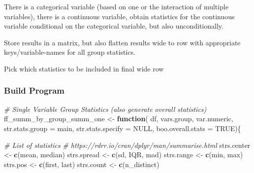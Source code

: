 \documentclass[
]{book}
\newenvironment{Shaded}{\begin{snugshade}}{\end{snugshade}}
\newcommand{\CommentTok}[1]{\textcolor[rgb]{0.56,0.35,0.01}{\textit{#1}}}
\newcommand{\ControlFlowTok}[1]{\textcolor[rgb]{0.13,0.29,0.53}{\textbf{#1}}}
\newcommand{\DataTypeTok}[1]{\textcolor[rgb]{0.13,0.29,0.53}{#1}}
\newcommand{\KeywordTok}[1]{\textcolor[rgb]{0.13,0.29,0.53}{\textbf{#1}}}
\newcommand{\NormalTok}[1]{#1}
\newcommand{\OtherTok}[1]{\textcolor[rgb]{0.56,0.35,0.01}{#1}}
\newcommand{\StringTok}[1]{\textcolor[rgb]{0.31,0.60,0.02}{#1}}
\begin{document}
There is a categorical variable (based on one or the interaction of multiple variables), there is a continuous variable, obtain statistics for the continuous variable conditional on the categorical variable, but also unconditionally.

Store results in a matrix, but also flatten results wide to row with appropriate keys/variable-names for all group statistics.

Pick which statistics to be included in final wide row

\hypertarget{build-program}{%
\subsubsection{Build Program}\label{build-program}}

\begin{Shaded}
\begin{Highlighting}[]
\CommentTok{\# Single Variable Group Statistics (also generate overall statistics)}
\NormalTok{ff\_summ\_by\_group\_summ\_one \textless{}{-}}\StringTok{ }\ControlFlowTok{function}\NormalTok{(}
\NormalTok{  df, vars.group, var.numeric, }\DataTypeTok{str.stats.group =} \StringTok{\textquotesingle{}main\textquotesingle{}}\NormalTok{,}
  \DataTypeTok{str.stats.specify =} \OtherTok{NULL}\NormalTok{, }\DataTypeTok{boo.overall.stats =} \OtherTok{TRUE}\NormalTok{)\{}
  
  \CommentTok{\# List of statistics}
  \CommentTok{\# https://rdrr.io/cran/dplyr/man/summarise.html}
\NormalTok{  strs.center \textless{}{-}}\StringTok{ }\KeywordTok{c}\NormalTok{(}\StringTok{\textquotesingle{}mean\textquotesingle{}}\NormalTok{, }\StringTok{\textquotesingle{}median\textquotesingle{}}\NormalTok{)}
\NormalTok{  strs.spread \textless{}{-}}\StringTok{ }\KeywordTok{c}\NormalTok{(}\StringTok{\textquotesingle{}sd\textquotesingle{}}\NormalTok{, }\StringTok{\textquotesingle{}IQR\textquotesingle{}}\NormalTok{, }\StringTok{\textquotesingle{}mad\textquotesingle{}}\NormalTok{)}
\NormalTok{  strs.range \textless{}{-}}\StringTok{ }\KeywordTok{c}\NormalTok{(}\StringTok{\textquotesingle{}min\textquotesingle{}}\NormalTok{, }\StringTok{\textquotesingle{}max\textquotesingle{}}\NormalTok{)}
\NormalTok{  strs.pos \textless{}{-}}\StringTok{ }\KeywordTok{c}\NormalTok{(}\StringTok{\textquotesingle{}first\textquotesingle{}}\NormalTok{, }\StringTok{\textquotesingle{}last\textquotesingle{}}\NormalTok{)}
\NormalTok{  strs.count \textless{}{-}}\StringTok{ }\KeywordTok{c}\NormalTok{(}\StringTok{\textquotesingle{}n\_distinct\textquotesingle{}}\NormalTok{)}
  

\end{Highlighting}
\end{Shaded}
\end{document}
